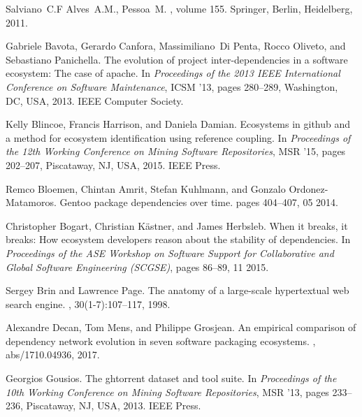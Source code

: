 \documentclass[10pt,conference]{IEEEtran}
\begin{document}
\begin{thebibliography}{10}

  Salviano~C.F Alves~A.M., Pessoa~M.
  , volume 155.
  \newblock Springer, Berlin, Heidelberg, 2011.
  
  Gabriele Bavota, Gerardo Canfora, Massimiliano~Di Penta, Rocco Oliveto, and
    Sebastiano Panichella.
  \newblock The evolution of project inter-dependencies in a software ecosystem:
    The case of apache.
  \newblock In {\em Proceedings of the 2013 IEEE International Conference on
    Software Maintenance}, ICSM '13, pages 280--289, Washington, DC, USA, 2013.
    IEEE Computer Society.
  
  Kelly Blincoe, Francis Harrison, and Daniela Damian.
  \newblock Ecosystems in github and a method for ecosystem identification using
    reference coupling.
  \newblock In {\em Proceedings of the 12th Working Conference on Mining Software
    Repositories}, MSR '15, pages 202--207, Piscataway, NJ, USA, 2015. IEEE
    Press.
  
  Remco Bloemen, Chintan Amrit, Stefan Kuhlmann, and Gonzalo Ordonez-Matamoros.
  \newblock Gentoo package dependencies over time.
  \newblock pages 404--407, 05 2014.
  
  Christopher Bogart, Christian K{\"a}stner, and James Herbsleb.
  \newblock When it breaks, it breaks: How ecosystem developers reason about the
    stability of dependencies.
  \newblock In {\em Proceedings of the ASE Workshop on Software Support for
    Collaborative and Global Software Engineering (SCGSE)}, pages 86--89, 11
    2015.
  
  Sergey Brin and Lawrence Page.
  \newblock The anatomy of a large-scale hypertextual web search engine.
  , 30(1-7):107--117, 1998.
  
  Alexandre Decan, Tom Mens, and Philippe Grosjean.
  \newblock An empirical comparison of dependency network evolution in seven
    software packaging ecosystems.
  , abs/1710.04936, 2017.
  
  Georgios Gousios.
  \newblock The ghtorrent dataset and tool suite.
  \newblock In {\em Proceedings of the 10th Working Conference on Mining Software
    Repositories}, MSR '13, pages 233--236, Piscataway, NJ, USA, 2013. IEEE
    Press.
  

\end{thebibliography}
\end{document}
